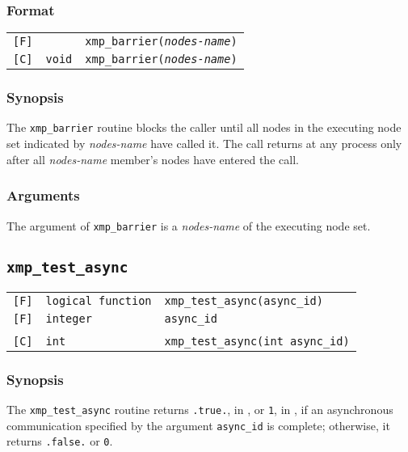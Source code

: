 \subsubsection*{Format}

\begin{tabular}{lll}

\verb![F]!&  & {\tt xmp\_barrier({\it nodes-name})}\\

\verb![C]!&  {\tt void}& {\tt  xmp\_barrier({\it nodes-name})}

\end{tabular}

\subsubsection*{Synopsis}
    The {\tt xmp\_barrier} routine blocks the caller until all nodes in the executing node set 
    indicated by {\it nodes-name} have called it.
    The call returns at any process only after all {\it nodes-name} member's nodes
    have entered the call.

\subsubsection*{Arguments}
    The argument of {\tt xmp\_barrier} is a {\it nodes-name} of the executing node set.

\vspace{0.3cm}

\subsection{\tt xmp\_test\_async}

\begin{tabular}{lll}

\verb![F]!& {\tt logical function} & {\tt xmp\_test\_async(async\_id)}\\
\verb![F]!& {\tt integer} & {\tt async\_id}\\
          & & \\
\verb![C]!&  {\tt int} & {\tt  xmp\_test\_async(int async\_id)}

\end{tabular}

\subsubsection*{Synopsis}

The {\tt xmp\_test\_async} routine returns {\tt .true.}, in {\Fort}, or
{\tt 1}, in {\C}, if an asynchronous communication specified by the
argument {\tt async\_id} is complete; otherwise, it returns {\tt .false.}
or {\tt 0}.


